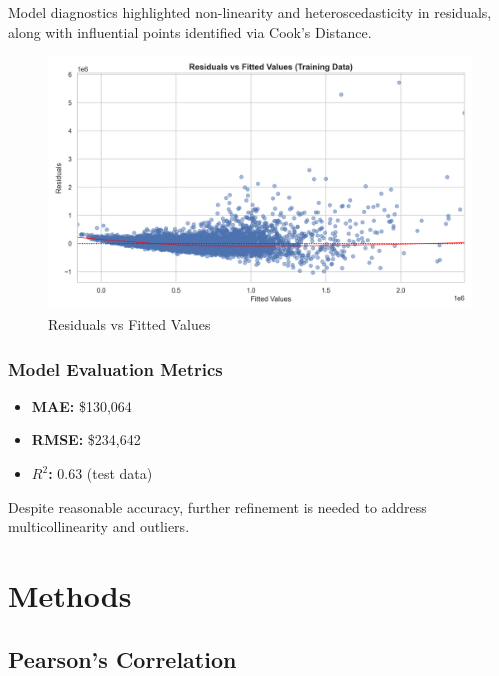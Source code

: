 \documentclass[11pt]{article}
\begin{document}
Model diagnostics highlighted non-linearity and heteroscedasticity in residuals, along with influential points identified via Cook's Distance.

\begin{figure}[htbp]
    \centering
    \includegraphics[width=\linewidth]{results/figures/residuals_vs_fitted_train.png}
    \caption{Residuals vs Fitted Values}
    \label{fig:residuals_vs_fitted_train}
\end{figure}

\subsubsection{Model Evaluation Metrics}
\begin{itemize}
    \item \textbf{MAE:} \$130,064
    \item \textbf{RMSE:} \$234,642
    \item \textbf{\(R^2\):} 0.63 (test data)
\end{itemize}
Despite reasonable accuracy, further refinement is needed to address multicollinearity and outliers.











\section{Methods}
\label{Methods}

\subsection{Pearson's Correlation}
\label{Pearsons-Correlation}
\end{document}
